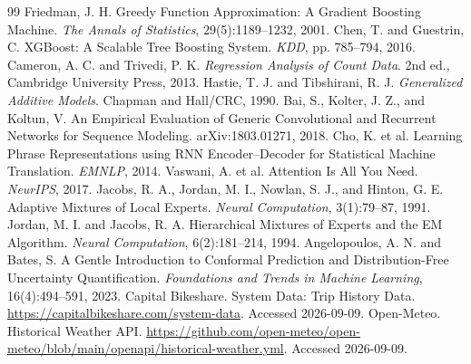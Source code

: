 \documentclass[UTF8,11pt,a4paper]{ctexart}
\begin{document}
\begin{thebibliography}{99}
 Friedman, J. H. Greedy Function Approximation: A Gradient Boosting Machine. \emph{The Annals of Statistics}, 29(5):1189--1232, 2001.
 Chen, T. and Guestrin, C. XGBoost: A Scalable Tree Boosting System. \emph{KDD}, pp. 785--794, 2016.
 Cameron, A. C. and Trivedi, P. K. \emph{Regression Analysis of Count Data}. 2nd ed., Cambridge University Press, 2013.
 Hastie, T. J. and Tibshirani, R. J. \emph{Generalized Additive Models}. Chapman and Hall/CRC, 1990.
 Bai, S., Kolter, J. Z., and Koltun, V. An Empirical Evaluation of Generic Convolutional and Recurrent Networks for Sequence Modeling. arXiv:1803.01271, 2018.
 Cho, K. et al. Learning Phrase Representations using RNN Encoder--Decoder for Statistical Machine Translation. \emph{EMNLP}, 2014.
 Vaswani, A. et al. Attention Is All You Need. \emph{NeurIPS}, 2017.
 Jacobs, R. A., Jordan, M. I., Nowlan, S. J., and Hinton, G. E. Adaptive Mixtures of Local Experts. \emph{Neural Computation}, 3(1):79--87, 1991.
 Jordan, M. I. and Jacobs, R. A. Hierarchical Mixtures of Experts and the EM Algorithm. \emph{Neural Computation}, 6(2):181--214, 1994.
 Angelopoulos, A. N. and Bates, S. A Gentle Introduction to Conformal Prediction and Distribution-Free Uncertainty Quantification. \emph{Foundations and Trends in Machine Learning}, 16(4):494--591, 2023.
 Capital Bikeshare. System Data: Trip History Data. \url{https://capitalbikeshare.com/system-data}. Accessed 2026-09-09.
 Open-Meteo. Historical Weather API. \url{https://github.com/open-meteo/open-meteo/blob/main/openapi/historical-weather.yml}. Accessed 2026-09-09.
\end{thebibliography}
\end{document}
